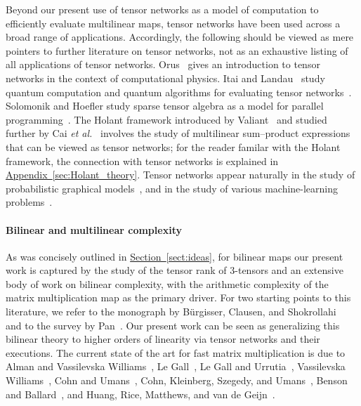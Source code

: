 \documentclass[11pt]{article}
\numberwithin{equation}{section}
\theoremstyle{definition}
\theoremstyle{plain}
\newcommand{\expref}[2]{\hyperref[#2]{#1~\ref{#2}}}
\begin{document}
Beyond our present use of tensor networks as a model of computation to efficiently evaluate multilinear maps, tensor networks 
%
have been  %
used across a broad range of applications. Accordingly, the following should be viewed as mere pointers to further literature on tensor networks, not as an exhaustive listing of all applications of tensor networks. Orus~\cite{Orus2014} gives an introduction to tensor networks in the context of computational physics. Itai and Landau~\cite{ItaiL2010} study quantum computation and quantum algorithms for evaluating tensor networks~\cite{ItaiL2010}. Solomonik and Hoefler study sparse tensor algebra as a model for parallel programming~\cite{SolomonikH2015}. The Holant framework
introduced by Valiant~\cite{Valiant2008} and studied further by
Cai \emph{et al.}~\cite{CaiLX2011,CaiGW2016a} involves the study of multilinear
sum--product expressions that can be viewed as tensor networks; for the reader familar with the Holant framework, the connection with tensor networks is explained in \expref{Appendix}{sec:Holant_theory}.
Tensor networks appear naturally in the study of probabilistic graphical
models~\cite{KollerF2009,MoitraW2018,RobevaS2017,WainwrightJ2008},
and in the study of various machine-learning
problems~\cite{CichockiLOPZM2016,CichockiPZLOSM2017}.

\paragraph*{Bilinear and multilinear complexity}

As was concisely outlined in \expref{Section}{sect:ideas}, for bilinear maps our present work %
%
%
is captured by
%
the study of
the  %
tensor rank of 3-tensors and an extensive body of work on bilinear complexity, with the arithmetic complexity of the matrix multiplication map as the primary driver. For two starting points to this literature, we refer to the monograph by B\"urgisser, Clausen, and Shokrollahi~\cite{Buergisser1997} and to the survey by Pan~\cite{Pan2014}. Our present work can be seen as generalizing this bilinear theory to higher orders of linearity via tensor networks and their executions. The current state of the art for fast matrix multiplication is due to Alman and Vassilevska Williams~\cite{AlmanVW2021}, Le Gall~\cite{LeGall2012,LeGall2014}, Le Gall and Urrutia~\cite{LeGallU2017}, Vassilevska Williams~\cite{VassilevskaWilliams2012}, Cohn and Umans~\cite{CohnU2013}, Cohn, Kleinberg, Szegedy, and Umans~\cite{Cohn2005}, Benson and Ballard~\cite{BensonB2015}, and Huang, Rice, Matthews, and van de Geijn~\cite{HuangRMG2017}.
\end{document}
